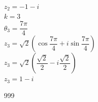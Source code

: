 \documentclass[a4paper]{article}
\begin{document}
$z_2 = -1 - i$\\



$k = 3$ \\

$\theta_3 = \dfrac{7\pi}{4}$ \\

$z_3 = \sqrt{2} \left(\cos \dfrac{7\pi}{4} + i \sin \dfrac{7\pi}{4}\right)$ \\

$z_3 = \sqrt{2} \left(\dfrac{\sqrt{2}}{2} - i \dfrac{\sqrt{2}}{2}\right)$ \\

$z_3 = 1 - i$\\

\begin{thebibliography}{999}
\end{thebibliography}
\end{document}
